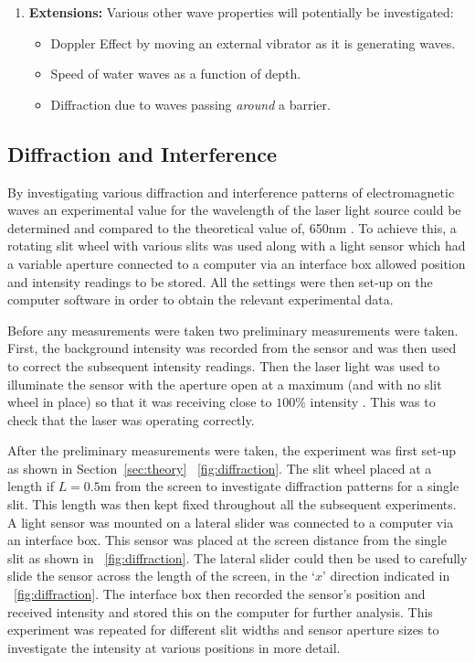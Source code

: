 \documentclass{article}
\newcommand{\figref}[2][\figurename~]{#1\ref{#2}}
\newcommand{\secref}[2][Section~]{#1\ref{#2}}
\begin{document}
\begin{enumerate}
  \item \textbf{Extensions:} Various other wave properties will potentially be investigated:
  	\begin{itemize}
     \item Doppler Effect by moving an external vibrator as it is generating waves.
     \item Speed of water waves as a function of depth.
     \item Diffraction due to waves passing \textit{around} a barrier.
   \end{itemize}
\end{enumerate}

\subsection{Diffraction and Interference}
\label{ssec:diffraction-method}

By investigating various diffraction and interference patterns of electromagnetic waves an experimental value for the wavelength of the laser light source could be determined and compared to the theoretical value of, 650nm \cite{Paper02}. To achieve this, a rotating slit wheel with various slits was used along with a light sensor which had a variable aperture connected to a computer via an interface box allowed position and intensity readings to be stored. All the settings were then set-up on the computer software in order to obtain the relevant experimental data. 

\vspace{2mm}
\noindent
Before any measurements were taken two preliminary measurements were taken. First, the background intensity was recorded from the sensor and was then used to correct the subsequent intensity readings. Then the laser light was used to illuminate the sensor with the aperture open at a maximum (and with no slit wheel in place) so that it was receiving close to $100\%$ intensity \cite{Paper01}. This was to check that the laser was operating correctly.

\vspace{2mm}
\noindent
After the preliminary measurements were taken, the experiment was first set-up as shown in \secref{sec:theory} \figref{fig:diffraction}. The slit wheel placed at a length if $L = 0.5$m from the screen to investigate diffraction patterns for a single slit. This length was then kept fixed throughout all the subsequent experiments. A light sensor was mounted on a lateral slider was connected to a computer via an interface box. This sensor was placed at the screen distance from the single slit as shown in \figref{fig:diffraction}. The lateral slider could then be used to carefully slide the sensor across the length of the screen, in the `$x$' direction indicated in \figref{fig:diffraction}. The interface box then recorded the sensor's position and received intensity and stored this on the computer for further analysis. This experiment was repeated for different slit widths and sensor aperture sizes to investigate the intensity at various positions in more detail.
\end{document}
